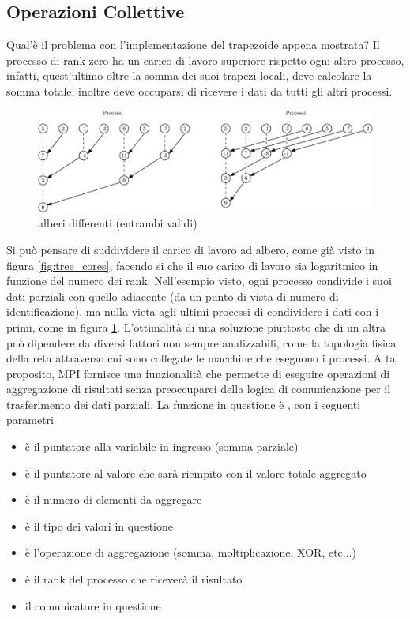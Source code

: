 \documentclass[10pt, letterpaper]{report}
\begin{document}
\subsection{Operazioni Collettive}
Qual'è il problema con l'implementazione del trapezoide appena mostrata? Il processo di rank zero ha un carico di lavoro superiore 
rispetto ogni altro processo, infatti, quest'ultimo oltre la somma dei suoi trapezi locali, deve calcolare 
la somma totale, inoltre deve occuparsi di ricevere i dati da tutti gli altri processi. 
\begin{figure}[h!]
    \centering
    \includegraphics[width=450pt]{images/tree2.eps}
    \caption{alberi differenti (entrambi validi)}
    \label{fig:tree_cores2}
\end{figure}\acc
Si può pensare di 
suddividere il carico di lavoro ad albero, come già visto in figura 
\ref{fig:tree_cores}, facendo si che il suo carico di lavoro sia logaritmico in funzione del numero dei rank. 
Nell'esempio visto, ogni processo condivide i suoi dati parziali con quello adiacente (da un punto di vista 
di numero di identificazione), ma nulla vieta agli ultimi processi di condividere i dati con i primi, come in figura 
\ref{fig:tree_cores2}.
L'ottimalità di una soluzione piuttosto che di un altra può dipendere da diversi fattori non sempre analizzabili, come 
la topologia fisica della reta attraverso cui sono collegate le macchine che eseguono i processi.\acc 
A tal proposito, MPI fornisce una funzionalità che permette di eseguire operazioni di aggregazione di risultati 
senza preoccuparci della logica di comunicazione per il trasferimento dei dati parziali. La funzione in questione è 
, con i seguenti parametri
\begin{itemize}
    \item {} è il puntatore alla variabile in ingresso (somma parziale)
    \item {} è il puntatore al valore che sarà riempito con il valore totale aggregato
    \item {} è il numero di elementi da aggregare
    \item {} è il tipo dei valori in questione
    \item {} è l'operazione di aggregazione (somma, moltiplicazione, XOR, etc...) 
    \item {} è il rank del processo che riceverà il risultato
    \item {} il comunicatore in questione
\end{itemize}
\end{document}
